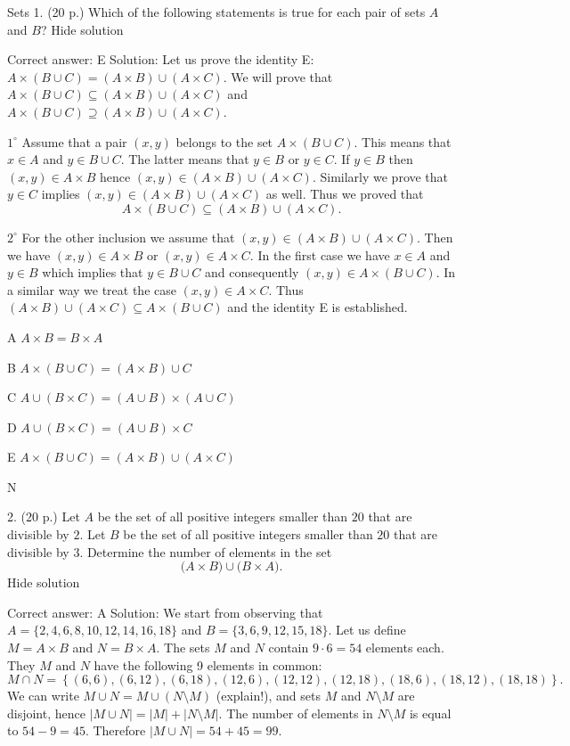 Sets
1.	(20 p.)
	Which of the following statements is true for each pair of sets \( A \) and \( B \)?
Hide solution

Correct answer: E
Solution: Let us prove the identity E: \( A\times (B\cup C)=(A\times B)\cup (A\times C) \). We will prove that \( A\times (B\cup C)\subseteq (A\times B)\cup (A\times C) \) and \( A\times (B\cup C)\supseteq (A\times B)\cup (A\times C) \).

\( 1^{\circ} \) Assume that a pair \( (x,y) \) belongs to the set \( A\times (B\cup C) \). This means that \( x\in A \) and \( y\in B\cup C \). The latter means that \( y\in B \) or \( y\in C \). If \( y\in B \) then \( (x,y)\in A\times B \) hence \( (x,y)\in (A\times B)\cup (A\times C) \). Similarly we prove that \( y\in C \) implies \( (x,y)\in (A\times B)\cup (A\times C) \) as well. Thus we proved that \[ A\times (B\cup C)\subseteq (A\times B)\cup (A\times C).\]

\( 2^{\circ} \) For the other inclusion we assume that \( (x,y)\in (A\times B)\cup (A\times C) \). Then we have \( (x,y) \in A\times B \) or \( (x,y)\in A\times C \). In the first case we have \( x\in A \) and \( y\in B \) which implies that \( y\in B\cup C \) and consequently \( (x,y)\in A\times (B\cup C) \). In a similar way we treat the case \( (x,y)\in A\times C \). Thus \( (A\times B)\cup (A\times C)\subseteq A\times (B\cup C) \) and the identity E is established.

   A    \( A\times B=B\times A \)

   B    \( A\times(B\cup C)=(A\times B)\cup C \)

   C    \( A\cup( B\times C)=(A\cup B)\times (A\cup C) \)

   D    \( A\cup (B\times C)=(A\cup B)\times C \)

   E    \( A\times (B\cup C)=(A\times B)\cup (A\times C) \)

   N
	

2.	(20 p.)
	Let \( A \) be the set of all positive integers smaller than \( 20 \) that are divisible by \( 2 \). Let \( B \) be the set of all positive integers smaller than \( 20 \) that are divisible by \( 3 \). Determine the number of elements in the set \[ \Big(A\times B\Big) \cup \Big(B \times A \Big).\]
Hide solution

Correct answer: A
Solution: We start from observing that \( A=\{2,4,6,8,10,12,14,16,18\} \) and \( B=\{3,6,9,12,15,18\} \). Let us define \( M=A\times B \) and \( N=B\times A \). The sets \( M \) and \( N \) contain \( 9\cdot 6=54 \) elements each. They \( M \) and \( N \) have the following 9 elements in common: \[ M\cap N=\left\{(6,6), (6,12), (6,18), (12,6), (12,12), (12,18), (18,6), (18,12), (18,18) \right\}. \] We can write \( M\cup N=M\cup (N\setminus M) \) (explain!), and sets \( M \) and \( N\setminus M \) are disjoint, hence \( |M\cup N|=|M|+|N\setminus M| \). The number of elements in \( N\setminus M \) is equal to \( 54-9=45 \). Therefore \( |M\cup N|=54+45=99 \).

